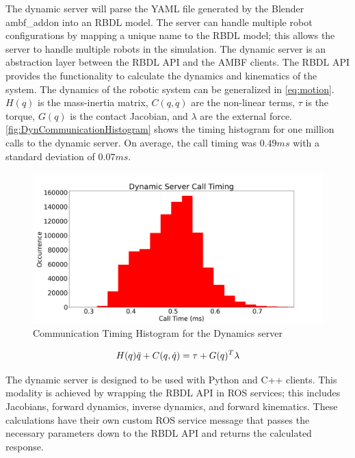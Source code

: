  The dynamic server will parse the YAML file generated by the Blender ambf\_addon into an RBDL model. The server can handle multiple robot configurations by mapping a unique name to the RBDL model; this allows the server to handle multiple robots in the simulation. 
 The dynamic server is an abstraction layer between the RBDL API and the AMBF clients. The RBDL API provides the functionality to calculate the dynamics and kinematics of the system. The dynamics of the robotic system can be generalized in  \autoref{eq:motion}. $H(q)$ is the mass-inertia matrix, $C(q,\Dot{q})$ are the non-linear terms, $\tau$ is the torque,  $G(q)$ is the contact Jacobian, and $\lambda$ are the external force. \autoref{fig:DynCommunicationHistogram} shows the timing histogram for one million calls to the dynamic server. On average, the call timing was $0.49ms$ with a standard deviation of $0.07ms$.  


 \begin{figure}
     \centering
     \includegraphics[scale=0.35]{images/software/dyn_loop_timing.png}
     \caption[Dynamic Timing Histogram]{Communication Timing Histogram for the Dynamics server}
     \label{fig:DynCommunicationHistogram}
 \end{figure}
 


\begin{equation}
\Large
    H(q) \Ddot{q} + C(q,\Dot{q}) = \tau + G(q)^T \lambda
    \label{eq:motion}
\end{equation}



The dynamic server is designed to be used with Python and C++ clients. This modality is achieved by wrapping the RBDL API in ROS services; this includes Jacobians, forward dynamics, inverse dynamics, and forward kinematics. These calculations have their own custom ROS service message that passes the necessary parameters down to the RBDL API and returns the calculated response. 

